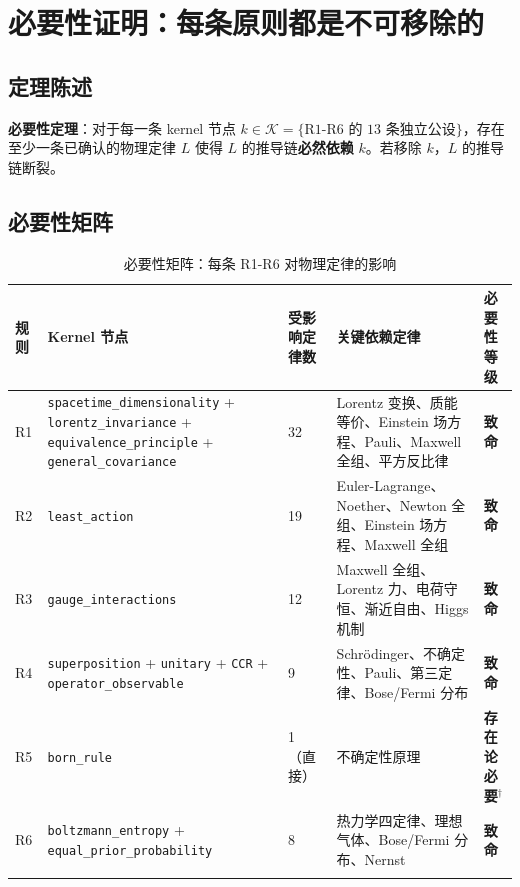 \section{必要性证明：每条原则都是不可移除的}

\subsection{定理陈述}

\textbf{必要性定理}：对于每一条 kernel 节点 $k \in \mathcal{K} = \{\text{R1-R6 的 13 条独立公设}\}$，存在至少一条已确认的物理定律 $L$ 使得 $L$ 的推导链\textbf{必然依赖} $k$。若移除 $k$，$L$ 的推导链断裂。

\subsection{必要性矩阵}

\begin{center}
\footnotesize
\begin{longtable}{p{1cm}p{4.5cm}p{1.5cm}p{5cm}p{1.5cm}}
\toprule
\textbf{规则} & \textbf{Kernel 节点} & \textbf{受影响定律数} & \textbf{关键依赖定律} & \textbf{必要性等级} \\
\midrule
R1 & \texttt{spacetime\_dimensionality} + \texttt{lorentz\_invariance} + \texttt{equivalence\_principle} + \texttt{general\_covariance} & 32 & Lorentz 变换、质能等价、Einstein 场方程、Pauli、Maxwell 全组、平方反比律 & \textbf{致命} \\
R2 & \texttt{least\_action} & 19 & Euler-Lagrange、Noether、Newton 全组、Einstein 场方程、Maxwell 全组 & \textbf{致命} \\
R3 & \texttt{gauge\_interactions} & 12 & Maxwell 全组、Lorentz 力、电荷守恒、渐近自由、Higgs 机制 & \textbf{致命} \\
R4 & \texttt{superposition} + \texttt{unitary} + \texttt{CCR} + \texttt{operator\_observable} & 9 & Schr\"odinger、不确定性、Pauli、第三定律、Bose/Fermi 分布 & \textbf{致命} \\
R5 & \texttt{born\_rule} & 1（直接） & 不确定性原理 & \textbf{存在论必要}$^\dagger$ \\
R6 & \texttt{boltzmann\_entropy} + \texttt{equal\_prior\_probability} & 8 & 热力学四定律、理想气体、Bose/Fermi 分布、Nernst & \textbf{致命} \\
\bottomrule
\caption{必要性矩阵：每条 R1-R6 对物理定律的影响}
\end{longtable}
\end{center}

